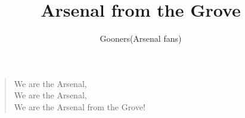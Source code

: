 \documentclass[a4paper,12pt]{article}
\title{Arsenal from the Grove}
\author{Gooners(Arsenal fans)}
\date{}
\begin{document}
	
	\maketitle
	
	\begin{verse}
		
		We are the Arsenal, \\
		We are the Arsenal, \\
		We are the Arsenal from the Grove!
		
	\end{verse}
	
\end{document}
